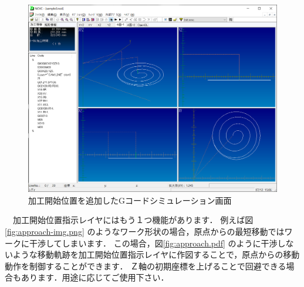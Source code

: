 \begin{figure}[H]
\centering
\includegraphics[scale=0.55]{No3/fig/sample3.png}
\caption{加工開始位置を追加したGコードシミュレーション画面}
\label{fig:sample3.png}
\end{figure}

　加工開始位置指示レイヤにはもう１つ機能があります．
例えば図\ref{fig:approach-img.png} のようなワーク形状の場合，原点からの最短移動ではワークに干渉してしまいます．
この場合，図\ref{fig:approach.pdf} のように干渉しないような移動軌跡を加工開始位置指示レイヤに作図することで，原点からの移動動作を制御することができます．
Ｚ軸の初期座標を上げることで回避できる場合もあります．用途に応じてご使用下さい．

